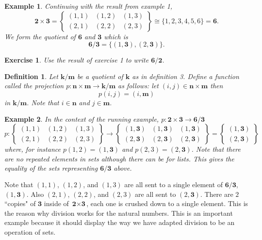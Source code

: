 \documentclass{article}
\theoremstyle{problemstyle}
\newtheorem{example}{Example}
\newtheorem{exercise}{Exercise}
\newtheorem{definition}{Definition}
\begin{document}
\begin{example}
Continuing with the result from example 1, 
$$\textbf{2} \times \textbf{3} = 
\left\{ \begin{array}{lll}
         (1,1) & (1,2) & (1,3)\\
         (2,1) & (2,2) & (2,3)\end{array} \right \} \cong \{1,2,3,4,5,6\} = \textbf{6}.$$ We form the quotient of $\textbf{6}$ and $\textbf{3}$ which is $$\textbf{6/3} = \{(1,\textbf{3}),(2,\textbf{3})\}.$$ 
\end{example}

\begin{exercise}
Use the result of exercise 1 to write $\textbf{6/2}$.
\end{exercise}

\begin{definition}
Let $\textbf{k/m}$ be a quotient of $\textbf{k}$ as in definition 3. Define a function called the projection $p:\textbf{n}\times\textbf{m} \rightarrow \textbf{k/m}$ as follows: let $(i,j) \in \textbf{n} \times \textbf{m}$ then $$p(i,j) = (i,\textbf{m})$$ in $\textbf{k/m}$. Note that $i \in \textbf{n}$ and $j \in \textbf{m}$. 
\end{definition}

\begin{example}
In the context of the running example, $p:\textbf{2}\times\textbf{3} \rightarrow \textbf{6/3}$ $$p:\left\{ \begin{array}{lll}
         (1,1) & (1,2) & (1,3)\\
         (2,1) & (2,2) & (2,3)\end{array} \right \} \rightarrow \left\{ \begin{array}{lll}
         (1,\textbf{3}) & (1,\textbf{3}) & (1,\textbf{3})\\
         (2,\textbf{3}) & (2,\textbf{3}) & (2,\textbf{3})\end{array} \right \} = \left\{ \begin{array}{l}
         (1,\textbf{3}) \\
         (2,\textbf{3}) \end{array} \right \} $$ where, for instance  $p(1,2) = (1,\textbf{3})$  and $p(2,3) = (2,\textbf{3})$. Note that there are no repeated elements in sets although there can be for lists. This gives the equality of the sets representing $\textbf{6/3}$ above. 
\end{example}

Note that  $(1,1)$, $(1,2)$, and $(1,3)$ are all sent to a single element of $\textbf{6/3}$, $(1,\textbf{3})$. Also $(2,1)$, $(2,2)$, and $(2,3)$ are all sent to $(2,\textbf{3})$. There are $2$ ``copies" of $\textbf{3}$ inside of $\textbf{2} \times \textbf{3}$, each one is crushed down to a single element. This is the reason why division works for the natural numbers. This is an important example because it should display the way we have adapted division to be an operation of sets.\\
\end{document}
